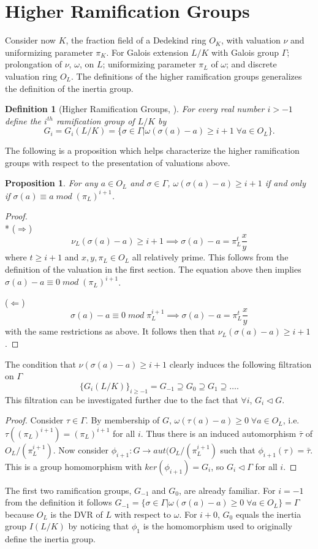 \documentclass[paper=a4, fontsize=11pt]{scrartcl} %
\numberwithin{equation}{section} %
\numberwithin{figure}{section} %
\numberwithin{table}{section} %
\theoremstyle{break}
\newtheorem{defn}{Definition}
\newtheorem{prop}{Proposition}
\begin{document}
\section{Higher Ramification Groups}
Consider now $K$, the fraction field of a Dedekind ring $O_K$, with valuation $\nu$ and uniformizing parameter $\pi_K$. For Galois extension $L/K$ with Galois group $\Gamma$; prolongation of $\nu$, $\omega$, on $L$; uniformizing parameter $\pi_L$ of $\omega$; and discrete valuation ring $O_L$. The definitions of the higher ramification groups generalizes the definition of the inertia group.
\begin{defn}[Higher Ramification Groups, \cite{Serre}]
For every real number $i > -1$ define the $i^{th}$ ramification group of $L/K$ by
$$
G_i = G_i(L/K) = \{\sigma \in \Gamma | \omega(\sigma(a)-a)\geq i+1 \;\forall a \in O_L\}.
$$
\end{defn}
The following is a proposition which helps characterize the higher ramification groups with respect to the presentation of valuations above.
\begin{prop}
For any $a \in O_L$ and $\sigma \in \Gamma$, $\omega(\sigma(a) - a) \geq i+1$ if and only if  $\sigma(a) \equiv a \; mod \; (\pi_L)^{i+1}$.
\end{prop}
\begin{proof}
\mbox{}\\*
($\Rightarrow$)
$$
\nu_L(\sigma(a)-a) \geq i+1 \implies \sigma(a)-a = \pi_L^{t}\frac{x}{y}
$$
where $t \geq i+1$ and $x,y,\pi_L\in O_L$ all relatively prime. This follows from the definition of the valuation in the first section. The equation above then implies $\sigma(a)-a \equiv 0 \; mod \; (\pi_L)^{i+1}$.

($\Leftarrow$) $$\sigma(a)-a \equiv 0 \; mod \; \pi_L^{i+1} \implies \sigma(a)-a = \pi_L^{t}\frac{x}{y}$$
with the same restrictions as above. It follows then that $\nu_L(\sigma(a)-a) \geq i+1$.
\end{proof}
The condition that $\nu(\sigma(a)-a) \geq i+1$ clearly induces the following filtration on $\Gamma$
$$
\{G_i(L/K)\}_{i\geq -1} = G_{-1} \supseteq G_0 \supseteq G_1 \supseteq \ldots.
$$
This filtration can be investigated further due to the fact that $\forall i$, $G_i \triangleleft G$.
\begin{proof} Consider $\tau \in \Gamma$. By membership of $G$, $\omega(\tau(a) - a) \geq 0\;\forall a\in O_L$, i.e. $\tau((\pi_L)^{i+1}) = (\pi_L)^{i+1}$ for all $i$. Thus there is an induced automorphism $\bar{\tau}$ of $O_L/(\pi_L^{i+1})$. Now consider $\phi_{i+1}:G \to aut(O_L/(\pi_L^{i+1})$ such that $\phi_{i+1}(\tau)=\bar{\tau}$. This is a group homomorphism with $ker(\phi_{i+1})=G_i$, so $G_i \triangleleft \Gamma$ for all $i$.
\end{proof} 
The first two ramification groups, $G_{-1}$ and $G_0$, are already familiar. For $i=-1$ from the definition it follows $G_{-1} = \{\sigma \in \Gamma |\omega(\sigma(a)-a) \geq 0\;\forall a\in O_L\}=\Gamma$ because $O_L$ is the DVR of $L$ with respect to $\omega$. For $i+0$, $G_{0}$ equals the inertia group $I(L/K)$ by noticing that $\phi_1$ is the homomorphism used to originally define the inertia group.
\end{document}
